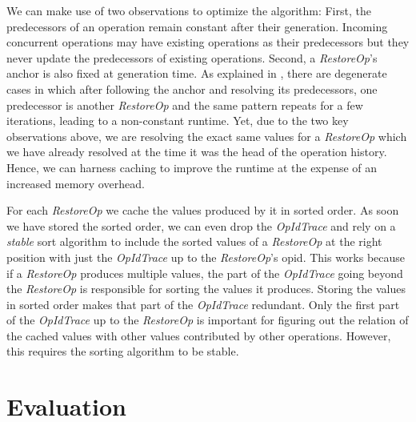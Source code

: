 \documentclass[sigplan,natbib=false,review]{acmart}
\newcommand{\restopkind}{\textit{RestoreOp}}
\newcommand{\opidtrace}{\textit{OpIdTrace}}
\begin{document}
We can make use of two observations to optimize the algorithm:
First, the predecessors of an operation remain constant after their generation.
Incoming concurrent operations may have existing operations as their predecessors
but they never update the predecessors of existing operations.
Second, a \restopkind{}'s anchor is also fixed at generation time.
As explained in , there are degenerate cases in which after
following the anchor and resolving its predecessors, one predecessor is another
\restopkind{} and the same pattern repeats for a few iterations,
leading to a non-constant runtime.
Yet, due to the two key observations above, we are resolving the exact same values
for a \restopkind{} which we have already resolved at the time it was the head of
the operation history.
Hence, we can harness caching to improve the runtime at the expense of an
increased memory overhead.

For each \restopkind{} we cache the values produced by it in sorted order.
As soon we have stored the sorted order, we can even drop the \opidtrace{} and rely
on a \emph{stable} sort algorithm to include the sorted values of a \restopkind{}
at the right position with just the \opidtrace{} up to the \restopkind{}'s \gls*{opid}.
This works because if a \restopkind{} produces multiple values, the part of the \opidtrace{}
going beyond the \restopkind{} is responsible for sorting the values it produces.
Storing the values in sorted order makes that part of the \opidtrace{} redundant.
Only the first part of the \opidtrace{} up to the \restopkind{} is important for figuring
out the relation of the cached values with other values contributed by other operations.
However, this requires the sorting algorithm to be stable.

\section{Evaluation}\label{sec:evaluation}

\end{document}
